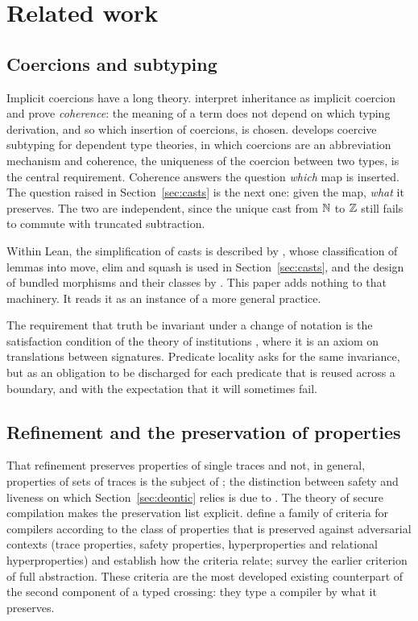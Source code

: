 \section{Related work}
\label{sec:related}

\subsection{Coercions and subtyping}

Implicit coercions have a long theory. \citet{breazu1991} interpret inheritance as
implicit coercion and prove \emph{coherence}: the meaning of a term does not depend on
which typing derivation, and so which insertion of coercions, is chosen.
\citet{luo1999} develops coercive subtyping for dependent type theories, in which
coercions are an abbreviation mechanism and coherence, the uniqueness of the coercion
between two types, is the central requirement. Coherence answers the question
\emph{which} map is inserted. The question raised in Section~\ref{sec:casts} is the next
one: given the map, \emph{what} it preserves. The two are independent, since the unique
cast from $\mathbb{N}$ to $\mathbb{Z}$ still fails to commute with truncated subtraction.

Within Lean, the simplification of casts is described by \citet{lewis2020}, whose
classification of lemmas into move, elim and squash is used in
Section~\ref{sec:casts}, and the design of bundled morphisms and their classes by
\citet{baanen2022}. This paper adds nothing to that machinery. It reads it as an
instance of a more general practice.

The requirement that truth be invariant under a change of notation is the satisfaction
condition of the theory of institutions \citep{goguen1992}, where it is an axiom on
translations between signatures. Predicate locality asks for the same invariance, but as
an obligation to be discharged for each predicate that is reused across a boundary, and
with the expectation that it will sometimes fail.

\subsection{Refinement and the preservation of properties}

That refinement preserves properties of single traces and not, in general, properties of
sets of traces is the subject of \citet{clarkson2010}; the distinction between safety and
liveness on which Section~\ref{sec:deontic} relies is due to \citet{alpern1985}. The
theory of secure compilation makes the preservation list explicit. \citet{abate2019}
define a family of criteria for compilers according to the class of properties that is
preserved against adversarial contexts (trace properties, safety properties,
hyperproperties and relational hyperproperties) and establish how the criteria relate;
\citet{patrignani2019} survey the earlier criterion of full abstraction. These criteria
are the most developed existing counterpart of the second component of a typed crossing:
they type a compiler by what it preserves.

